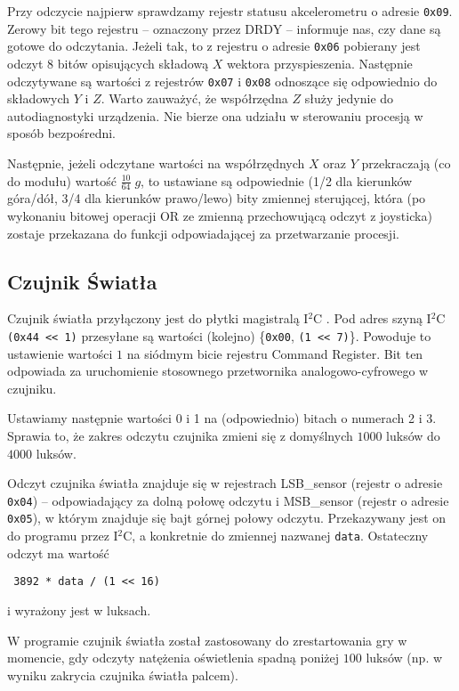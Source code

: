 \documentclass[a4paper,12pt,twoside]{article}
\theoremstyle{plain}
\theoremstyle{definition}
\theoremstyle{remark}
\begin{document}
Przy odczycie najpierw sprawdzamy rejestr statusu akcelerometru o adresie \verb|0x09|. Zerowy bit tego rejestru -- oznaczony przez DRDY -- informuje nas, czy dane są gotowe do odczytania. Jeżeli tak, to z rejestru o adresie \verb|0x06| pobierany jest  
odczyt $8$ bitów opisujących składową $X$ wektora przyspieszenia. Następnie odczytywane są wartości z rejestrów \verb|0x07| i \verb|0x08| odnoszące się odpowiednio do składowych $Y$ i $Z$. Warto zauważyć, że współrzędna $Z$ służy jedynie do autodiagnostyki urządzenia. Nie bierze ona udziału w sterowaniu procesją w sposób bezpośredni.

Następnie, jeżeli odczytane wartości na współrzędnych $X$ oraz $Y$ przekraczają (co do modułu) wartość $\frac{10}{64} \; g$, to ustawiane są odpowiednie (1/2 dla kierunków góra/dół, 3/4 dla kierunków prawo/lewo) bity zmiennej sterującej, która (po wykonaniu bitowej operacji OR ze zmienną przechowującą odczyt z joysticka) zostaje przekazana do funkcji odpowiadającej za przetwarzanie procesji.

\subsection{Czujnik \'Swiatła}
Czujnik światła przyłączony jest do płytki magistralą I$^2$C \cite{LUX}. Pod adres szyną I$^2$C \verb|(0x44 << 1)| przesyłane są wartości (kolejno) \{\verb|0x00|, \verb|(1 << 7)|\}. Powoduje to ustawienie wartości $1$ na siódmym bicie rejestru Command Register. Bit ten odpowiada za uruchomienie stosownego przetwornika analogowo-cyfrowego w czujniku.

Ustawiamy następnie wartości 0 i 1 na (odpowiednio) bitach o numerach 2 i 3. Sprawia to, że zakres odczytu czujnika zmieni się z domyślnych $1000$ luksów do $4000$ luksów.

Odczyt czujnika światła znajduje się w rejestrach LSB\_sensor (rejestr o adresie \verb|0x04|) -- odpowiadający za dolną połowę odczytu i MSB\_sensor (rejestr o adresie \verb|0x05|), w którym znajduje się bajt górnej połowy odczytu. Przekazywany jest on do programu przez I$^2$C, a konkretnie do zmiennej nazwanej \verb|data|. Ostateczny odczyt ma wartość
\begin{verbatim}
 3892 * data / (1 << 16)
\end{verbatim}
i wyrażony jest w luksach.

W programie czujnik światła został zastosowany do zrestartowania gry w momencie, gdy odczyty natężenia oświetlenia spadną poniżej $100$ luksów (np. w wyniku zakrycia czujnika światła palcem).
\end{document}
